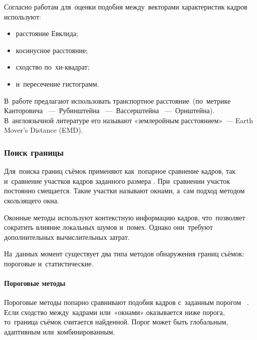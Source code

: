 Согласно работам \cite{Lu:2004} \cite{Camara-Chavez:2007} \cite{Cooper:2007}
для~оценки подобия между~векторами характеристик кадров используют:
\begin{itemize}
    \item расстояние Евклида;
    \item косинусное расстояние;
    \item сходство по~хи-квадрат;
    \item и~пересечение гистограмм.
\end{itemize}

В~работе \cite{Hoi:2006} предлагают использовать
транспортное расстояние\ (по~метрике
Канторовича
~—~Рубинштейна
~—~Вассерштейна
~—~Орнштейна).
В~англоязычной литературе его называют
«землеройным расстоянием»~—
Earth Mover's Distance (EMD).

\subsubsection{Поиск границы}

Для~поиска границ съёмок применяют как~попарное сравнение
кадров, так и~сравнение участков кадров заданного размера \cite{Cooper:2007}.
При~сравнении участок постоянно смещается.
Такие участки называют окнами,
а~сам подход методом скользящего окна.

Оконные методы используют контекстную информацию кадров,
что~позволяет сократить влияние локальных шумов и~помех.
Однако они~требуют дополнительных вычислительных затрат.

На~данных момент существует два типа методов обнаружения границ съёмок:
пороговые и~статистические.


\paragraph{Пороговые методы}

Пороговые методы попарно сравнивают подобия кадров
с~заданным порогом~\cite{Ko:2006} \cite{Cernekova:2006}.
Если сходство между~кадрами или~«окнами» оказывается ниже
порога, то~граница съёмок считается найденной.
Порог может быть глобальным, адаптивным или~комбинированным.

